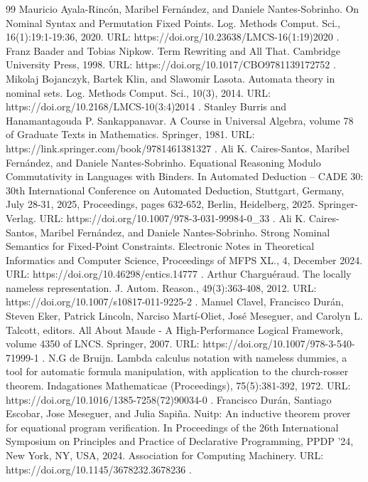 \begin{thebibliography}{99}
 Mauricio Ayala-Rincón, Maribel Fernández, and Daniele Nantes-Sobrinho. On Nominal Syntax and Permutation Fixed Points. Log. Methods Comput. Sci., 16(1):19:1-19:36, 2020. URL: https://doi.org/10.23638/LMCS-16(1:19)2020 .
 Franz Baader and Tobias Nipkow. Term Rewriting and All That. Cambridge University Press, 1998. URL: https://doi.org/10.1017/CBO9781139172752 .
 Mikolaj Bojanczyk, Bartek Klin, and Slawomir Lasota. Automata theory in nominal sets. Log. Methods Comput. Sci., 10(3), 2014. URL: https://doi.org/10.2168/LMCS-10(3:4)2014 .
 Stanley Burris and Hanamantagouda P. Sankappanavar. A Course in Universal Algebra, volume 78 of Graduate Texts in Mathematics. Springer, 1981. URL: https://link.springer.com/book/9781461381327 .
 Ali K. Caires-Santos, Maribel Fernández, and Daniele Nantes-Sobrinho. Equational Reasoning Modulo Commutativity in Languages with Binders. In Automated Deduction – CADE 30: 30th International Conference on Automated Deduction, Stuttgart, Germany, July 28-31, 2025, Proceedings, pages 632-652, Berlin, Heidelberg, 2025. Springer-Verlag. URL: https://doi.org/10.1007/978-3-031-99984-0\_33 .
 Ali K. Caires-Santos, Maribel Fernández, and Daniele Nantes-Sobrinho. Strong Nominal Semantics for Fixed-Point Constraints. Electronic Notes in Theoretical Informatics and Computer Science, Proceedings of MFPS XL., 4, December 2024. URL: https://doi.org/10.46298/entics.14777 .
 Arthur Charguéraud. The locally nameless representation. J. Autom. Reason., 49(3):363-408, 2012. URL: https://doi.org/10.1007/s10817-011-9225-2 .
 Manuel Clavel, Francisco Durán, Steven Eker, Patrick Lincoln, Narciso Martí-Oliet, José Meseguer, and Carolyn L. Talcott, editors. All About Maude - A High-Performance Logical Framework, volume 4350 of LNCS. Springer, 2007. URL: https://doi.org/10.1007/978-3-540-71999-1 .
 N.G de Bruijn. Lambda calculus notation with nameless dummies, a tool for automatic formula manipulation, with application to the church-rosser theorem. Indagationes Mathematicae (Proceedings), 75(5):381-392, 1972. URL: https://doi.org/10.1016/1385-7258(72)90034-0 .
 Francisco Durán, Santiago Escobar, Jose Meseguer, and Julia Sapiña. Nuitp: An inductive theorem prover for equational program verification. In Proceedings of the 26th International Symposium on Principles and Practice of Declarative Programming, PPDP '24, New York, NY, USA, 2024. Association for Computing Machinery. URL: https://doi.org/10.1145/3678232.3678236 .

\end{thebibliography}
